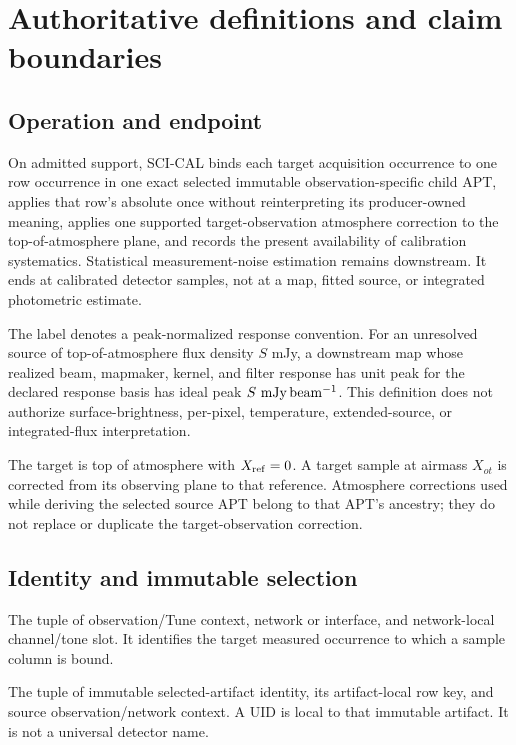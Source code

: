 \section{Authoritative definitions and claim boundaries}
\label{sec:definitions}

\subsection{Operation and endpoint}

 On admitted  support, SCI-CAL binds
each target acquisition occurrence to one row occurrence in one exact selected
immutable observation-specific child APT, applies that row's absolute
 once without reinterpreting its producer-owned meaning,
applies one supported target-observation atmosphere correction to the
top-of-atmosphere plane, and records the present availability of calibration
systematics. Statistical measurement-noise estimation remains downstream.
It ends at calibrated detector samples, not at a map, fitted source, or
integrated photometric estimate.

 The label denotes a peak-normalized
response convention. For an unresolved source of top-of-atmosphere flux
density $S$ mJy, a downstream map whose realized beam, mapmaker, kernel, and
filter response has unit peak for the declared response basis has ideal peak
$S\ \mathrm{mJy\,beam^{-1}}$. This definition does not authorize surface-brightness,
per-pixel, temperature, extended-source, or integrated-flux interpretation.

 The target is top of atmosphere with
$X_{\rm ref}=0$. A target sample at airmass $X_{ot}$ is corrected from its
observing plane to that reference. Atmosphere corrections used while deriving
the selected source APT belong to that APT's ancestry; they do not replace or
duplicate the target-observation correction.

\subsection{Identity and immutable selection}

 The tuple of observation/Tune context,
network or interface, and network-local channel/tone slot. It identifies the
target measured occurrence to which a sample column is bound.

 The tuple of immutable selected-artifact
identity, its artifact-local row key, and source observation/network context.
A UID is local to that immutable artifact. It is not a universal detector
name.

